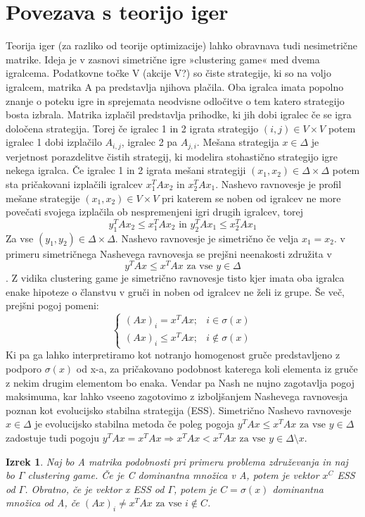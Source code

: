 \documentclass[a4paper]{article}
\newtheorem{theorem}{Izrek}
\begin{document}
\section{Povezava s teorijo iger}
Teorija iger (za razliko od teorije optimizacije) lahko obravnava tudi nesimetrične matrike. Ideja je v zasnovi simetrične igre »clustering game« med dvema igralcema. Podatkovne točke V (akcije V?) so čiste strategije, ki so na voljo igralcem, matrika A pa predstavlja njihova plačila. Oba igralca imata popolno znanje o poteku igre in sprejemata neodvisne odločitve o tem katero strategijo bosta izbrala. Matrika izplačil predstavlja prihodke, ki jih dobi igralec če se igra določena strategija. Torej če igralec 1 in 2 igrata strategijo $(i,j)\in V\times V$ potem igralec 1 dobi izplačilo $A_{i,j}$, igralec 2 pa $A_{j,i}$.
Mešana strategija $x\in\Delta$ je verjetnost porazdelitve čistih strategij, ki modelira stohastično strategijo igre nekega igralca. Če igralec 1 in 2 igrata mešani strategiji $(x_1,x_2)\in\Delta\times\Delta$  potem sta pričakovani izplačili igralcev $x_1^TAx_2$ in $x_2^TAx_1$.
Nashevo ravnovesje je profil mešane strategije $(x_1,x_2)\in V\times V$ pri katerem se noben od igralcev ne more povečati svojega izplačila ob nespremenjeni igri drugih igralcev, torej 
$$y_1^TAx_2\leq x_1^TAx_2 \text{ in } y_2^TAx_1\leq x_2^TAx_1$$
Za vse $(y_1,y_2)\in\Delta\times\Delta$. Nashevo ravnovesje je simetrično če velja $x_1=x_2$. v primeru simetričnega Nashevega ravnovesja se prejšni neenakosti združita v
$$y^TAx\leq x^TAx \text{ za vse } y\in\Delta$$.
Z vidika clustering game je simetrično ravnovesje tisto kjer imata oba igralca enake hipoteze o članstvu v gruči in noben od igralcev ne želi iz grupe. Še več, prejšni pogoj pomeni:
$$\begin{cases}
(Ax)_i=x^TAx; & i\in\sigma(x) \\ (Ax)_i\leq x^TAx; & i\not\in\sigma(x)
\end{cases}$$
Ki pa ga lahko interpretiramo kot notranjo homogenost gruče predstavljeno z podporo $\sigma(x)$ od x-a, za pričakovano podobnost katerega koli elementa iz gruče z nekim drugim elementom bo enaka.
Vendar pa Nash ne nujno zagotavlja pogoj maksimuma, kar lahko vseeno zagotovimo z izboljšanjem Nashevega ravnovesja poznan kot evolucijsko stabilna strategija (ESS). Simetrično Nashevo ravnovesje $x\in\Delta$ je evolucijsko stabilna metoda če poleg pogoja $y^TAx\leq x^TAx \text{ za vse } y\in\Delta$ zadostuje tudi pogoju $y^TAx= x^TAx \Rightarrow x^TAx<x^TAx \text{ za vse } y\in\Delta\setminus x$.
\begin{theorem}
Naj bo A matrika podobnosti pri primeru problema združevanja in naj bo $\Gamma$ clustering game. Če je C dominantna množica v A, potem je vektor $x^C$ ESS od $\Gamma$. Obratno, če je vektor x ESS od $\Gamma$, potem je $C=\sigma(x)$ dominantna množica od A, če $(Ax)_i\not=x^TAx \text{ za vse } i \not\in C$.
\end{theorem}
\end{document}
